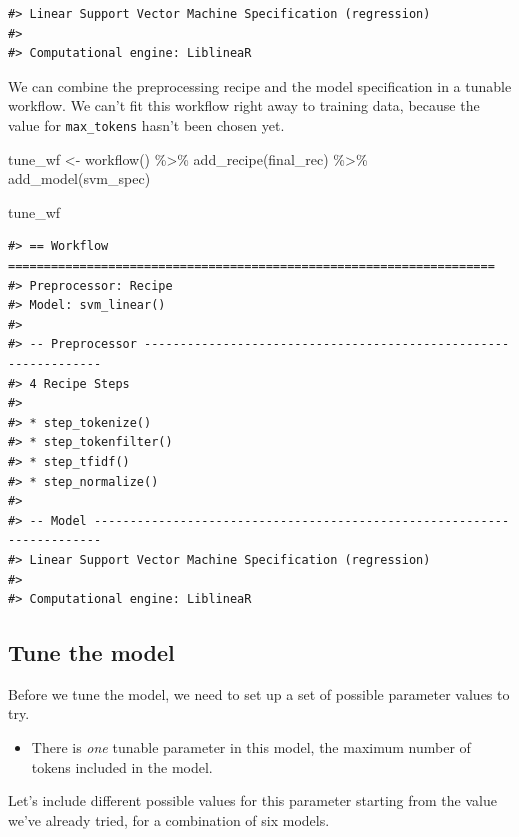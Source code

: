 \documentclass[
]{krantz}
\makeatletter
\newenvironment{Shaded}{\begin{snugshade}}{\end{snugshade}}
\newcommand{\FunctionTok}[1]{\textcolor[rgb]{0.00,0.00,0.00}{#1}}
\newcommand{\NormalTok}[1]{#1}
\newcommand{\OtherTok}[1]{\textcolor[rgb]{0.56,0.35,0.01}{#1}}
\newcommand{\SpecialCharTok}[1]{\textcolor[rgb]{0.00,0.00,0.00}{#1}}
\newenvironment{kframe}{%
\medskip{}
\setlength{\fboxsep}{.8em}
 \def\at@end@of@kframe{}%
 \ifinner\ifhmode%
  \def\at@end@of@kframe{\end{minipage}}%
  \begin{minipage}{\columnwidth}%
 \fi\fi%
 \def\FrameCommand##1{\hskip\@totalleftmargin \hskip-\fboxsep
 \colorbox{shadecolor}{##1}\hskip-\fboxsep
     \hskip-\linewidth \hskip-\@totalleftmargin \hskip\columnwidth}%
 \MakeFramed {\advance\hsize-\width
   \@totalleftmargin\z@ \linewidth\hsize
   \@setminipage}}%
 {\par\unskip\endMakeFramed%
 \at@end@of@kframe}
\renewenvironment{Shaded}{\begin{kframe}}{\end{kframe}}
\newenvironment{rmdblock}[1]
  {\begin{shaded*}
  \begin{itemize}[left = -1cm, labelsep = 1cm]
  \renewcommand{\labelitemi}{
    \raisebox{-.7\height}[0pt][0pt]{
      {\setkeys{Gin}{width=3em,keepaspectratio}\texttt{[image: images/\#1]}}
    }
  }
 
  \item
  }
  {
  \end{itemize}
  \end{shaded*}
  }
\newenvironment{rmdwarning}
  {\begin{rmdblock}{warning}}
  {\end{rmdblock}}
\makeatother
\begin{document}
\begin{verbatim}
#> Linear Support Vector Machine Specification (regression)
#> 
#> Computational engine: LiblineaR
\end{verbatim}

We can combine the preprocessing recipe and the model specification in a tunable workflow. We can't fit this workflow right away to training data, because the value for \texttt{max\_tokens} hasn't been chosen yet.

\begin{Shaded}
\begin{Highlighting}[]
\NormalTok{tune\_wf }\OtherTok{\textless{}{-}} \FunctionTok{workflow}\NormalTok{() }\SpecialCharTok{\%\textgreater{}\%}
  \FunctionTok{add\_recipe}\NormalTok{(final\_rec) }\SpecialCharTok{\%\textgreater{}\%}
  \FunctionTok{add\_model}\NormalTok{(svm\_spec)}

\NormalTok{tune\_wf}
\end{Highlighting}
\end{Shaded}

\begin{verbatim}
#> == Workflow ====================================================================
#> Preprocessor: Recipe
#> Model: svm_linear()
#> 
#> -- Preprocessor ----------------------------------------------------------------
#> 4 Recipe Steps
#> 
#> * step_tokenize()
#> * step_tokenfilter()
#> * step_tfidf()
#> * step_normalize()
#> 
#> -- Model -----------------------------------------------------------------------
#> Linear Support Vector Machine Specification (regression)
#> 
#> Computational engine: LiblineaR
\end{verbatim}

\hypertarget{tune-the-model}{%
\subsection{Tune the model}\label{tune-the-model}}

Before we tune the model, we need to set up a set of possible parameter values to try.

\begin{rmdwarning}
There is \emph{one} tunable parameter in this model, the maximum number
of tokens included in the model.
\end{rmdwarning}

Let's include different possible values for this parameter starting from the value we've already tried, for a combination of six models.
\end{document}
